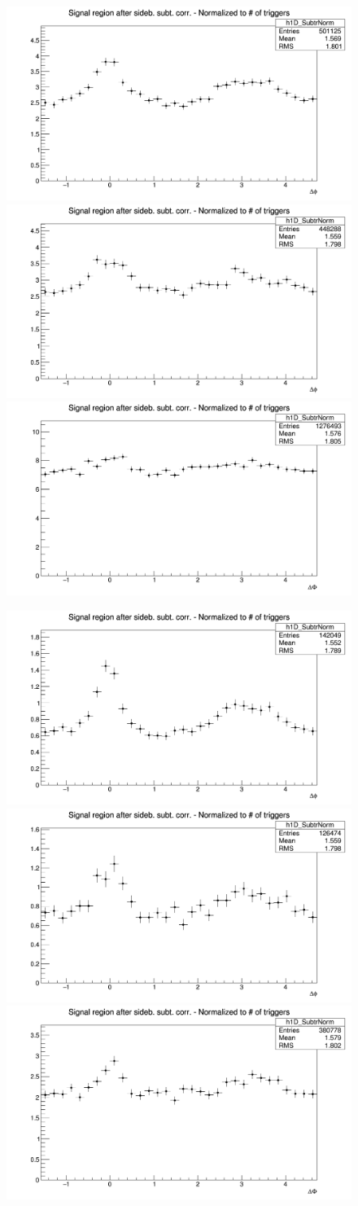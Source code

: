 \begin{figure}[!htbp]
{\includegraphics[width=0.31\linewidth, height=0.23\linewidth]{figures/Dzero/AzimCorrDistr_Dzero_Canvas_PtIntBins6to8_PoolInt_thrdot3to99dot.png}}
{\includegraphics[width=0.31\linewidth, height=0.23\linewidth]{figures/DplusPlotsweff/AzimCorrDistr_Dplus_Canvas_PtIntBins5to7_PoolInt_thrdot3to99dot.png}}
{\includegraphics[width=0.31\linewidth, height=0.23\linewidth]{figures/Dstar_wEFF/AzimCorrDistr_Dstar_Canvas_PtIntBins4to6_PoolInt_thrdot3to99dot.png}}

{\includegraphics[width=0.31\linewidth, height=0.23\linewidth]{figures/Dzero/AzimCorrDistr_Dzero_Canvas_PtIntBins6to8_PoolInt_thr1dotto99dot.png}}
{\includegraphics[width=0.31\linewidth, height=0.23\linewidth]{figures/DplusPlotsweff/AzimCorrDistr_Dplus_Canvas_PtIntBins5to7_PoolInt_thr1dotto99dot.png}}
{\includegraphics[width=0.31\linewidth, height=0.23\linewidth]{figures/Dstar_wEFF/AzimCorrDistr_Dstar_Canvas_PtIntBins4to6_PoolInt_thr1dotto99dot.png}}

\end{figure}

